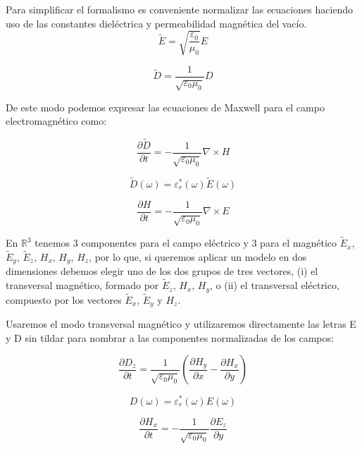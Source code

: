 \documentclass[11pt,a4paper,twoside,pdf]{article}
\numberwithin{equation}{section}
\begin{document}
Para simplificar el formalismo es conveniente normalizar las ecuaciones haciendo uso de las constantes dieléctrica y permeabilidad magnética del vacío.
\begin{equation}
\tilde{E}=\sqrt{\frac{\varepsilon_{0}}{\mu_{0}}}E
\end{equation}

\begin{equation}
\tilde{D}=\frac{1}{\sqrt{\varepsilon_{0}\mu_{0}}}D
\end{equation}

De este modo podemos expresar las ecuaciones de Maxwell para el campo electromagnético como:

\begin{equation}
\frac{\partial \tilde{D}}{\partial t}=-\frac{1}{\sqrt{\varepsilon_{0}\mu_{0}}}\nabla \times H
\end{equation}

\begin{equation}
\tilde{D}(\omega)=\varepsilon^*_{r}(\omega)\tilde{E}(\omega)
\end{equation}

\begin{equation}
\frac{\partial H}{\partial t}=-\frac{1}{\sqrt{\varepsilon_{0}\mu_{0}}}\nabla \times E
\end{equation}


En $\mathbb R^{3}$ tenemos 3 componentes para el campo eléctrico y 3 para el magnético $\tilde{E}_{x}$, $\tilde{E}_{y}$, $\tilde{E}_{z}$, $H_{x}$, $H_{y}$, $H_{z}$, por lo que, si queremos aplicar un modelo en dos dimensiones debemos elegir uno de los dos grupos de tres vectores, (i) el transversal magnético, formado por $\tilde{E}_{z}$, $H_{x}$, $H_{y}$, o (ii) el transversal eléctrico, compuesto por los vectores $\tilde{E}_{x}$, $\tilde{E}_{y}$ y $H_{z}$.

Usaremos el modo transversal magnético y utilizaremos directamente las letras E y D sin tildar para nombrar a las componentes normalizadas de los campos:

\begin{equation}
\frac{\partial D_{z}}{\partial t}=\frac{1}{\sqrt{\varepsilon_{0}\mu_{0}}}(\frac{\partial H_{y}}{\partial x}-\frac{\partial H_{x}}{\partial y})
\end{equation}

\begin{equation}
{D}(\omega)=\varepsilon^*_{r}(\omega)E(\omega)
\end{equation}

\begin{equation}
\frac{\partial H_{x}}{\partial t}=-\frac{1}{\sqrt{\varepsilon_{0}\mu_{0}}}\frac{\partial E_{z}}{\partial y}
\end{equation}
\end{document}
